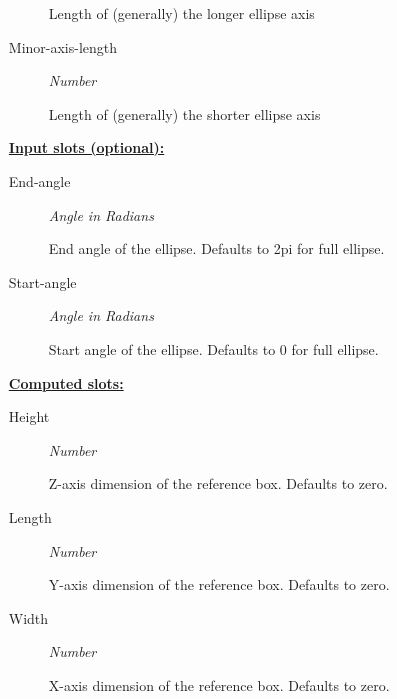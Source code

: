 \documentclass [11pt]{book}
\begin{document}
\begin{itemize}
\begin{description}
 Length of (generally) the longer ellipse axis




\item [Minor-axis-length]
\emph{Number}

 Length of (generally) the shorter ellipse axis




\end{description}






\textbf{
\underline{Input slots (optional):}}

\begin{description}

\item [End-angle]
\emph{Angle in Radians}

 End angle of the ellipse. Defaults to 2pi for full ellipse.




\item [Start-angle]
\emph{Angle in Radians}

 Start angle of the ellipse. Defaults to 0 for full ellipse.




\end{description}






\textbf{
\underline{Computed slots:}}

\begin{description}

\item [Height]
\emph{Number}

 Z-axis dimension of the reference box. Defaults to zero.




\item [Length]
\emph{Number}

 Y-axis dimension of the reference box. Defaults to zero.




\item [Width]
\emph{Number}

 X-axis dimension of the reference box. Defaults to zero.




\end{description}








\end{itemize}
\end{document}
